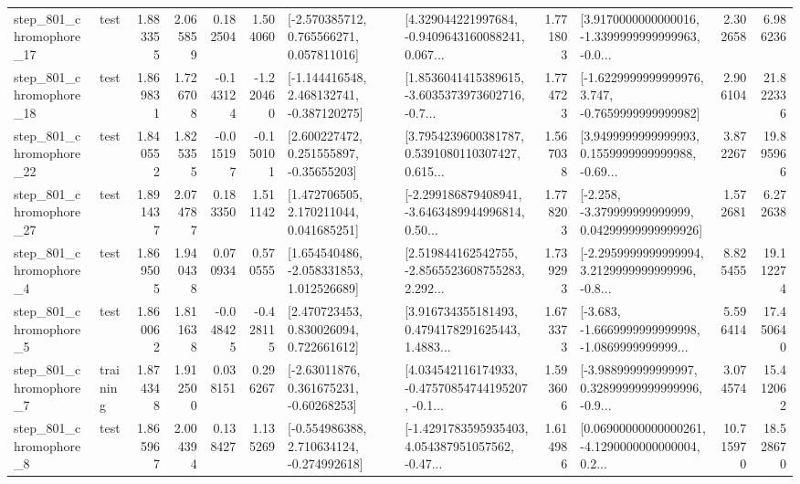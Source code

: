 \begin{tabular}{llrrrrllrlrr}
  step\_801\_chromophore\_17 &      test &      1.883355 &    2.065859 &      0.182504 &  1.504060 &    [-2.570385712, 0.765566271, 0.057811016] &  [4.329044221997684, -0.9409643160088241, 0.067... &       1.771803 &  [3.9170000000000016, -1.3399999999999963, -0.0... &            2.302658 &          6.986236 \\
  step\_801\_chromophore\_18 &      test &      1.869831 &    1.726708 &     -0.143124 & -1.220460 &   [-1.144416548, 2.468132741, -0.387120275] &  [1.8536041415389615, -3.6035373973602716, -0.7... &       1.774723 &  [-1.6229999999999976, 3.747, -0.7659999999999982] &            2.906104 &         21.822336 \\
  step\_801\_chromophore\_22 &      test &      1.840552 &    1.825355 &     -0.015197 & -0.150101 &     [2.600227472, 0.251555897, -0.35655203] &  [3.7954239600381787, 0.5391080110307427, 0.615... &       1.567038 &  [3.9499999999999993, 0.1559999999999988, -0.69... &            3.872267 &         19.895966 \\
  step\_801\_chromophore\_27 &      test &      1.891437 &    2.074787 &      0.183350 &  1.511142 &     [1.472706505, 2.170211044, 0.041685251] &  [-2.299186879408941, -3.6463489944996814, 0.50... &       1.778203 &  [-2.258, -3.379999999999999, 0.04299999999999926] &            1.572681 &          6.272638 \\
   step\_801\_chromophore\_4 &      test &      1.869505 &    1.940438 &      0.070934 &  0.570555 &    [1.654540486, -2.058331853, 1.012526689] &  [2.519844162542755, -2.8565523608755283, 2.292... &       1.739293 &  [-2.2959999999999994, 3.2129999999999996, -0.8... &            8.825455 &         19.112274 \\
   step\_801\_chromophore\_5 &      test &      1.860062 &    1.811638 &     -0.048425 & -0.428115 &     [2.470723453, 0.830026094, 0.722661612] &  [3.916734355181493, 0.4794178291625443, 1.4883... &       1.673373 &  [-3.683, -1.6669999999999998, -1.0869999999999... &            5.596414 &         17.450640 \\
   step\_801\_chromophore\_7 &  training &      1.874348 &    1.912500 &      0.038151 &  0.296267 &     [-2.63011876, 0.361675231, -0.60268253] &  [4.034542116174933, -0.47570854744195207, -0.1... &       1.593606 &  [-3.988999999999997, 0.32899999999999996, -0.9... &            3.074574 &         15.412062 \\
   step\_801\_chromophore\_8 &      test &      1.865967 &    2.004394 &      0.138427 &  1.135269 &   [-0.554986388, 2.710634124, -0.274992618] &  [-1.4291783595935403, 4.054387951057562, -0.47... &       1.614986 &  [0.06900000000000261, -4.1290000000000004, 0.2... &           10.715970 &         18.528670 \\

\end{tabular}

